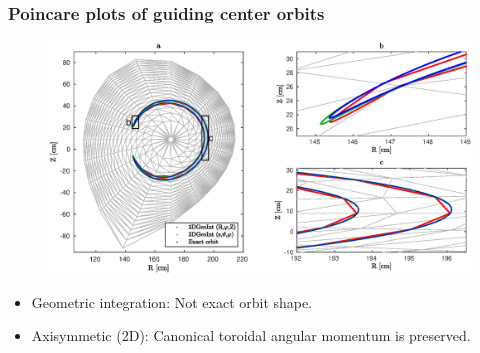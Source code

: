 \documentclass{beamer}
\newcommand{\be}[1]{\begin{equation} \label{#1}}
\newcommand{\ee}{\end{equation}}
\begin{document}

\begin{frame}
\frametitle{Poincare plots of guiding center orbits}
\vspace{-1.1cm}
\begin{figure}
	\hspace*{-0.9cm}\includegraphics[width=1.0\textwidth]{FIGURES/orbit_plot.eps}
\end{figure}
\begin{itemize}
	\vspace*{-0.5cm}
\item Geometric integration: Not exact orbit shape.
\item Axisymmetic (2D): Canonical toroidal angular momentum is preserved.
\end{itemize}
\end{frame}
\end{document}
